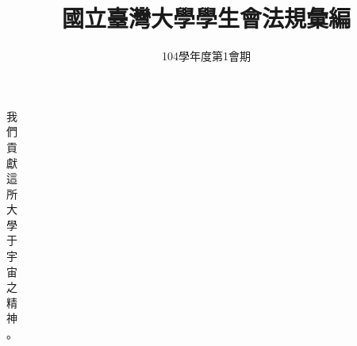 \documentclass[9pt,a4paper]{article}
\title{\huge 國立臺灣大學學生會法規彙編} %
\date{104學年度第1會期} %
\begin{document}
\clearpage

\maketitle %

\newpage
\thispagestyle{empty}
\vspace*{\fill}
\begin{center}
\end{center}
\vspace*{\fill}

\newpage
\thispagestyle{empty}
\vspace*{\fill}
\begin{center}
\huge 我\\們\\貢\\獻\\這\\所\\大\\學\\于\\宇\\宙\\之\\精\\神\\。
\end{center}
\vspace*{\fill}

\newpage
\thispagestyle{empty}
\vspace*{\fill}
\begin{center}
\end{center}
\vspace*{\fill}

\newpage
\tableofcontents{}
\end{document}
